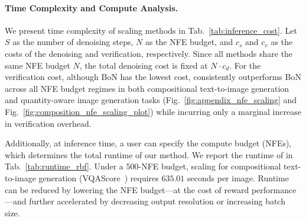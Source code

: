 



\paragraph{Time Complexity and Compute Analysis.}
We present time complexity of scaling methods in Tab.~\ref{tab:inference_cost}. 
% 
Let $S$ as the number of denoising steps, $N$ as the NFE budget, and $c_s$ and $c_v$ as the costs of the denoising and verification, respectively. 
% 
Since all methods share the same NFE budget $N$, the total denoising cost is fixed at $N \cdot c_d$. 
% 
For the verification cost, although BoN has the lowest cost, \Ours{} consistently outperforms BoN across all NFE budget regimes in both compositional text-to-image generation and quantity-aware image generation tasks (Fig.~\ref{fig:appendix_nfe_scaling} and Fig.~\ref{fig:composition_nfe_scaling_plot}) while incurring only a marginal increase in verification overhead.


Additionally, at inference time, a user can specify the compute budget (NFEs), which determines the total runtime of our method. We report the runtime of \Ours{} in Tab.~\ref{tab:runtime_rbf}. Under a $500$-NFE budget, scaling for compositional text-to-image generation (VQAScore~\cite{Lin:2024CLIPFlanT5}) requires $635.01$ seconds per image. 
Runtime can be reduced by lowering the NFE budget—at the cost of reward performance—and further accelerated by decreasing output resolution or increasing batch size. 



